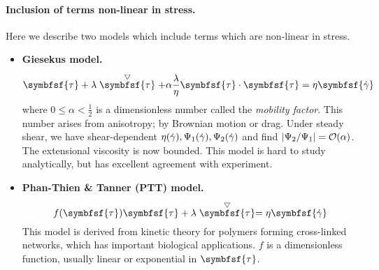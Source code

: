 \documentclass{jknotes}
\begin{document}
\paragraph{Inclusion of terms non-linear in stress.}
Here we describe two models which include terms which are non-linear in
stress. 
\begin{eg}
	\hspace{1em}
	\begin{itemize}
		\item \textbf{Giesekus model.} 
			\begin{equation}
				\symbfsf{\tau} + \lambda
				\stackrel{\bigtriangledown}{\symbfsf{\tau}} + \alpha
				\frac{\lambda}{\eta} \symbfsf{\tau}\cdot\symbfsf{\tau} = \eta
				\symbfsf{\srate}
			\end{equation}
			where $0 \le \alpha < \frac{1}{2}$ is a dimensionless number
			called the \emph{mobility factor}. This number arises from
			anisotropy; by Brownian motion or drag. Under steady shear, we
			have shear-dependent $\eta(\dot{\gamma}), \Psi_1(\dot{\gamma}),
			\Psi_2(\dot{\gamma})$ and find $\abs{\Psi_2/\Psi_1} =
			\mathcal{O}(\alpha)$. The extensional viscosity is now bounded.
			This model is hard to study analytically, but has excellent
			agreement with experiment.
		\item \textbf{Phan-Thien \& Tanner (PTT) model.} 
			\begin{equation}
				f(\symbfsf{\tau})\symbfsf{\tau} + \lambda
				\stackrel{\bigtriangledown}{\symbfsf{\tau}} = \eta
				\symbfsf{\srate}
			\end{equation}
			This model is derived from kinetic theory for polymers forming
			cross-linked networks, which has important biological
			applications. $f$ is a dimensionless function, usually linear or
			exponential in $\symbfsf{\tau}$.
	\end{itemize}
\end{eg}
\end{document}
